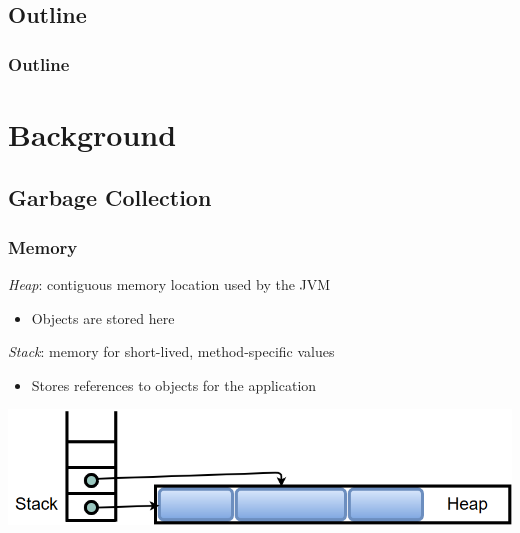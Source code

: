 \documentclass{beamer}
\newcommand{\linespace}{\vskip 0.25cm}
\begin{document}
\subsection*{Outline}

\begin{frame}
  \frametitle{Outline}
  \tableofcontents  
\end{frame}



\section[Background]{Background}

\subsection[GC Basics]{Garbage Collection}

\begin{frame}

\frametitle{Memory}

\emph{Heap}: contiguous memory location used by the JVM
\begin{itemize}
\item Objects are stored here
\end{itemize}

\linespace
\linespace

\emph{Stack}: memory for short-lived, method-specific values
\begin{itemize}
\item Stores references to objects for the application
\end{itemize}

\linespace
\linespace

\begin{center}
\includegraphics[width=.8\textwidth]{Illustrations/stack_and_heap.png}
\end{center}

\end{frame}
\end{document}
